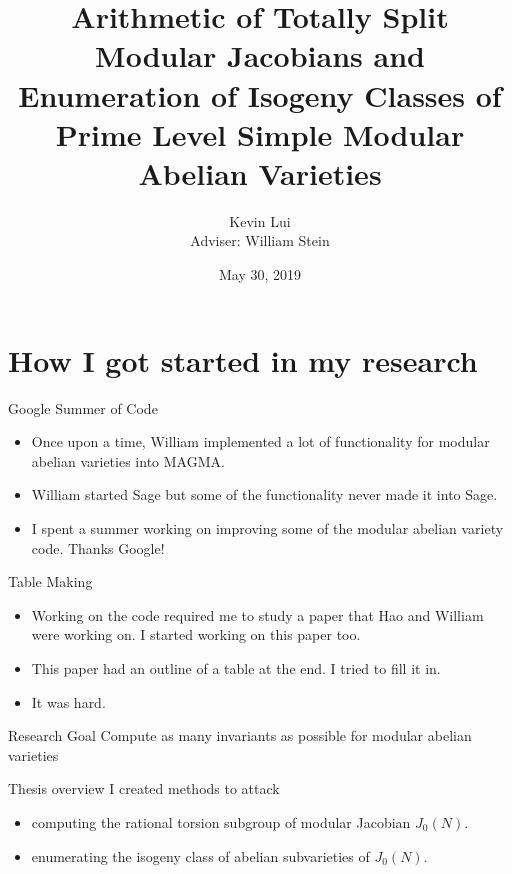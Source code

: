 \documentclass{beamer}
\title{%
    Arithmetic of Totally Split Modular Jacobians and Enumeration of Isogeny
    Classes of Prime Level Simple Modular Abelian Varieties
}
\author{Kevin Lui\\Adviser: William Stein}
\date{May 30, 2019}
\institute{Final Exam}
\begin{document}
\frame{\titlepage}

\section{How I got started in my research}

\begin{frame}{Google Summer of Code}
    \begin{itemize}
        \item 
            Once upon a time, William implemented a lot of functionality
            for modular abelian varieties into MAGMA.
        \item
            William started Sage but some of the functionality never made it
            into Sage.
        \item
            I spent a summer working on improving some of the modular abelian
            variety code. Thanks Google!
    \end{itemize} 
\end{frame}

\begin{frame}{Table Making}
    \begin{itemize}
        \item
            Working on the code required me to study a paper that Hao and
            William were working on. I started working on this paper too.
        \item
            This paper had an outline of a table at the end. I tried to fill it
            in.
        \item
            It was hard.
   \end{itemize} 
\end{frame}

\begin{frame}{Research Goal}
    \Huge{Compute as many invariants as possible for modular abelian
    varieties}
\end{frame}

\begin{frame}{Thesis overview}
    I created methods to attack
    \begin{itemize}
        \item
            computing the rational torsion subgroup of modular
            Jacobian $J_0(N)$.
        \item
            enumerating the isogeny class of abelian subvarieties of
            $J_0(N)$.
    \end{itemize}
\end{frame}
\end{document}
